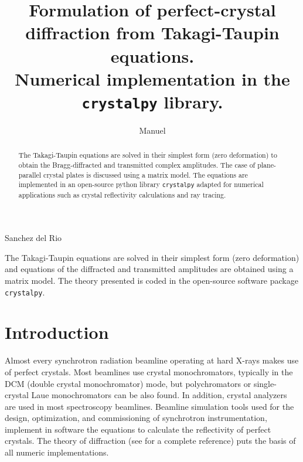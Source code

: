 \documentclass{iucr}
\begin{document}

\title{Formulation of perfect-crystal diffraction  from Takagi-Taupin equations. \\ Numerical implementation in the \texttt{crystalpy} library.}


\author[a]{Manuel}{Sanchez del Rio}



\maketitle   %

\begin{synopsis}
The Takagi-Taupin equations are solved in their simplest form (zero deformation) and equations of the diffracted and transmitted amplitudes are obtained using a matrix model. The theory presented is coded in the open-source software package {\tt crystalpy}.
\end{synopsis}

\begin{abstract}

The Takagi-Taupin equations are solved in their simplest form (zero deformation) to obtain the Bragg-diffracted and transmitted complex amplitudes. The case of plane-parallel crystal plates is discussed using a matrix model. The equations are implemented in an open-source python library \texttt{crystalpy} adapted for numerical applications such as crystal reflectivity calculations and ray tracing.

\end{abstract}


%
\section{Introduction}
\label{sec:Intro}

Almost every synchrotron radiation beamline operating at hard X-rays makes use of perfect crystals.  
Most beamlines use crystal monochromators, typically in the DCM (double crystal monochromator) mode, but polychromators or single-crystal Laue monochromators can be also found. In addition, crystal analyzers are used in most spectroscopy beamlines. 
Beamline simulation tools used for the design, optimization, and commissioning of synchrotron instrumentation, implement in software the equations to calculate the reflectivity of perfect crystals. The theory of diffraction (see \cite{authierbook} for a complete reference) puts the basis of all numeric implementations. 
\end{document}
